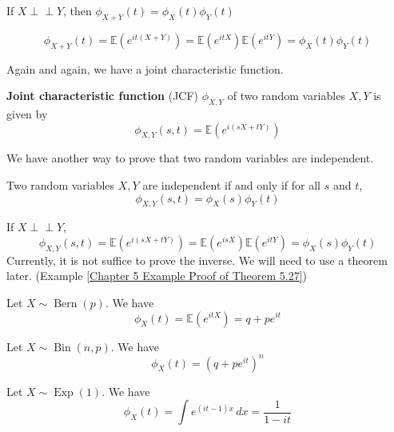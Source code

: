 \documentclass{huhtakm-template-book}
\newcommand{\independent}{\perp\!\!\!\perp}
\newcommand{\expect}{\mathbb{E}}
\DeclareMathOperator{\Bern}{Bern}
\DeclareMathOperator{\Bin}{Bin}
\DeclareMathOperator{\Exp}{Exp}
\begin{document}
\begin{thm}
	If $X\independent Y$, then $\phi_{X+Y}(t)=\phi_{X}(t)\phi_{Y}(t)$
\end{thm}
\begin{proofing}
	\begin{equation*}
		\phi_{X+Y}(t)=\expect(e^{it(X+Y)})=\expect(e^{itX})\expect(e^{itY})=\phi_{X}(t)\phi_{Y}(t)
	\end{equation*}
\end{proofing}
Again and again, we have a joint characteristic function.
\begin{defn}
	\textbf{Joint characteristic function} (JCF) $\phi_{X,Y}$ of two random variables $X,Y$ is given by
	\begin{equation*}
		\phi_{X,Y}(s,t)=\expect(e^{i(sX+tY)})
	\end{equation*}
\end{defn}
We have another way to prove that two random variables are independent.
\begin{thm}
	\label{Chapter 5 Theorem Independent via CF}
	Two random variables $X,Y$ are independent if and only if for all $s$ and $t$,
	\begin{equation*}
		\phi_{X,Y}(s,t)=\phi_{X}(s)\phi_{Y}(t)
	\end{equation*}
\end{thm}
\begin{proofing}
	If $X\independent Y$,
	\begin{equation*}
		\phi_{X,Y}(s,t)=\expect(e^{i(sX+tY)})=\expect(e^{isX})\expect(e^{itY})=\phi_{X}(s)\phi_{Y}(t)
	\end{equation*}
	Currently, it is not suffice to prove the inverse. We will need to use a theorem later. (Example \ref{Chapter 5 Example Proof of Theorem 5.27})
\end{proofing}
\begin{eg}
	Let $X\sim\Bern(p)$. We have
	\begin{equation*}
		\phi_{X}(t)=\expect(e^{itX})=q+pe^{it}
	\end{equation*}
\end{eg}
\begin{eg}
	Let $X\sim\Bin(n,p)$. We have
	\begin{equation*}
		\phi_{X}(t)=(q+pe^{it})^{n}
	\end{equation*}
\end{eg}
\begin{eg}
	Let $X\sim\Exp(1)$. We have
	\begin{equation*}
		\phi_{X}(t)=\int e^{(it-1)x}\,dx=\frac{1}{1-it}
	\end{equation*}
\end{eg}
\end{document}
